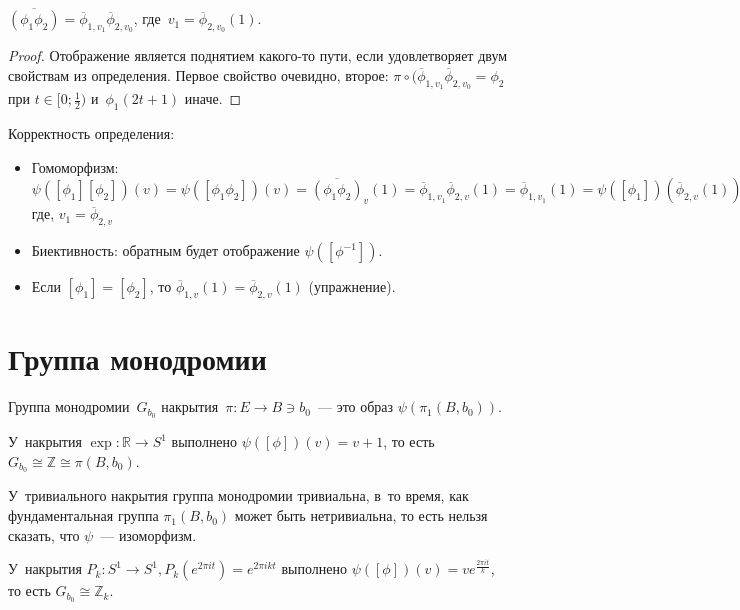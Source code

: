 \documentclass{article}
\begin{document}
\begin{claim}
	$\overline{(\phi_1 \phi_2)} = \overline\phi_{1,v_1} \overline\phi_{2,v_0}$,
	где~$v_1 = \overline\phi_{2,v_0}(1)$.
\end{claim}
\begin{proof}
	Отображение является поднятием какого-то пути, если удовлетворяет двум
	свойствам из определения. Первое свойство очевидно, второе: $\pi \circ
	(\overline\phi_{1,v_1}\overline\phi_{2,v_0} = \phi_2$ при $t \in [0;
	\frac{1}{2})$ и~$\phi_1(2t+1)$ иначе.
\end{proof}

Корректность определения:
\begin{itemize}
	\item Гомоморфизм: $\psi([\phi_1][\phi_2])(v) = \psi([\phi_1 \phi_2])(v) =
		\overline{(\phi_1 \phi_2)}_v(1) = \overline\phi_{1,v_1}
		\overline\phi_{2,v}(1) = \overline\phi_{1,v_1}(1) =
		\psi([\phi_1])(\overline\phi_{2,v}(1)) = \psi([\phi_1]) \circ
		\psi([\phi_2])(v)$ где, $v_1 = \overline\phi_{2,v}$
	\item Биективность: обратным будет отображение $\psi([\phi^{-1}])$.
	\item Если $[\phi_1] = [\phi_2]$, то $\overline\phi_{1,v}(1) =
		\overline\phi_{2,v}(1)$ (упражнение).
\end{itemize}

\section{Группа монодромии}

\begin{definition}
	Группа монодромии~$G_{b_0}$ накрытия~$\pi: E \rightarrow B \ni b_0$~--- это
	образ $\psi(\pi_1(B, b_0))$.
\end{definition}

\begin{example}
	У~накрытия $\exp: \mathbb{R} \rightarrow S^1$ выполнено $\psi([\phi])(v) =
	v + 1$, то есть $G_{b_0} \cong \mathbb{Z} \cong \pi(B, b_0)$.
\end{example}

\begin{example}
	У~тривиального накрытия группа монодромии тривиальна, в~то время, как
	фундаментальная группа $\pi_1(B, b_0)$ может быть нетривиальна, то есть нельзя
	сказать, что $\psi$~--- изоморфизм.
\end{example}

\begin{example}
	У~накрытия $P_k: S^1 \rightarrow S^1, P_k(e^{2\pi it}) = e^{2\pi ikt}$
	выполнено $\psi([\phi])(v) = v e^{\frac{2\pi it}{k}}$, то есть $G_{b_0} \cong
	\mathbb{Z}_k$.
\end{example}
\end{document}
